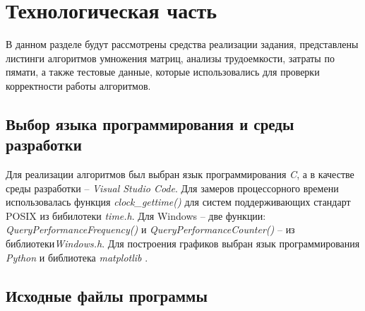 \chapter{Технологическая часть}

В данном разделе будут рассмотрены средства реализации задания,
представлены листинги алгоритмов умножения матриц,
анализы трудоемкости, затраты по пямати,
а также тестовые данные, которые использовались
для проверки корректности работы алгоритмов.

\section{Выбор языка программирования и среды разработки}

Для реализации алгоритмов был выбран язык программирования \textit{C},
а в качестве среды разработки -- \textit{Visual Studio Code}.
Для замеров процессорного времени использовалась функция
\textit{clock\_gettime()} \cite{get_clocktime} для систем поддерживающих
стандарт POSIX из бибилотеки \textit{time.h}.
Для Windows -- две функции:
\textit{QueryPerformanceFrequency()} \cite{QueryPerformanceFrequency} и
\textit{QueryPerformanceCounter()} \cite{QueryPerformanceCounter}
-- из библиотеки\textit{Windows.h}.
Для построения графиков выбран язык программирования \textit{Python}
и библиотека \textit{matplotlib} \cite{mpl}.

\section{Исходные файлы программы}


